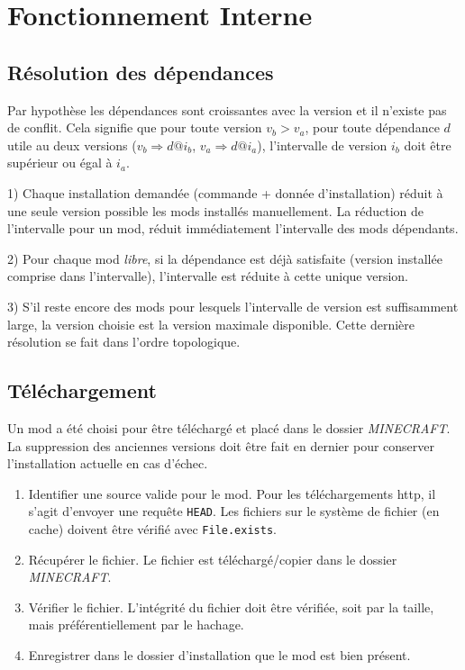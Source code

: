 \documentclass{article}
\begin{document}
%
%
\section{Fonctionnement Interne}

\subsection{Résolution des dépendances}
Par hypothèse les dépendances sont croissantes avec la version et il n'existe pas de conflit.
Cela signifie que pour toute version $v_b > v_a$, pour toute dépendance $d$ utile au deux versions ($v_b \Rightarrow d@i_b$, $v_a \Rightarrow d@i_a$), l'intervalle de version $i_b$ doit être supérieur ou égal à $i_a$.

1) Chaque installation demandée (commande + donnée d'installation) réduit à une seule version possible les mods installés manuellement.
La réduction de l'intervalle pour un mod, réduit immédiatement l'intervalle des mods dépendants.

2) Pour chaque mod \textit{libre}, si la dépendance est déjà satisfaite (version installée comprise dans l'intervalle), l'intervalle est réduite à cette unique version.

3) S'il reste encore des mods pour lesquels l'intervalle de version est suffisamment large, la version choisie est la version maximale disponible.
Cette dernière résolution se fait dans l'ordre topologique.

\subsection{Téléchargement}
Un mod a été choisi pour être téléchargé et placé dans le dossier \textit{MINECRAFT}.
La suppression des anciennes versions doit être fait en dernier pour conserver l'installation actuelle en cas d'échec.

\begin{enumerate}
	\item Identifier une source valide pour le mod.
Pour les téléchargements http, il s'agit d'envoyer une requête \texttt{HEAD}.
Les fichiers sur le système de fichier (en cache) doivent être vérifié avec \texttt{File.exists}.
	\item Récupérer le fichier.
Le fichier est téléchargé/copier dans le dossier \textit{MINECRAFT}.
	\item Vérifier le fichier.
L'intégrité du fichier doit être vérifiée, soit par la taille, mais préférentiellement par le hachage.
	\item Enregistrer dans le dossier d'installation que le mod est bien présent.
\end{enumerate}
\end{document}
